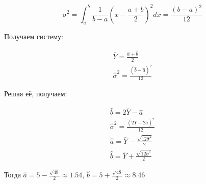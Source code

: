 \documentclass[addpoints, answers]{exam} %
\begin{document}
\begin{questions}
\begin{parts}
\begin{solution}
\[
  \sigma^2 = \int_a^b \frac{1}{b-a} \left(x-\frac{a+b}{2}\right)^2 dx = \frac{(b-a)^2}{12}
\]

Получаем систему:

\[
  \begin{array}{l}
	\bar Y = \frac{\hat a+ \hat b}{2} \\
	\hat\sigma^2 = \frac{(\hat b- \hat a)^2}{12}
  \end{array}
\]

Решая её, получаем:

\[
	\begin{array}{l}
	\hat b = 2 \bar Y - \hat a \\
	\hat\sigma^2 = \frac{(2 \bar Y-2\hat a)^2}{12} \\
	\hat a = \bar Y - \frac{\sqrt{12 \hat\sigma^2}}{2} \\
	\hat b = \bar Y + \frac{\sqrt{12 \hat\sigma^2}}{2}
  \end{array}
\]

Тогда $\hat{a} = 5 - \frac{\sqrt{48}}{2} \approx 1.54$, $\hat{b} = 5 + \frac{\sqrt{48}}{2} \approx 8.46$

\end{solution}


\end{parts}





\end{questions}
\end{document}
